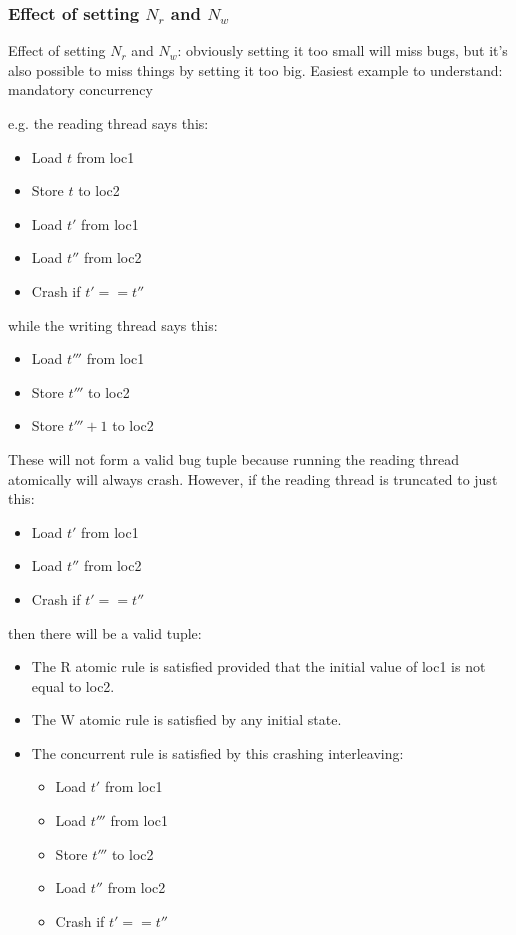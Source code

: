 \documentclass[12pt,a4paper]{book}
\begin{document}
\subsubsection{Effect of setting $N_r$ and $N_w$}
Effect of setting $N_r$ and $N_w$: obviously setting it too small will miss bugs, but it's also possible to miss things by setting it too big.
Easiest example to understand: mandatory concurrency

e.g. the reading thread says this:

\begin{itemize}
\item Load $t$ from loc1
\item Store $t$ to loc2
\item Load $t'$ from loc1
\item Load $t''$ from loc2
\item Crash if $t' == t''$
\end{itemize}

while the writing thread says this:

\begin{itemize}
\item Load $t'''$ from loc1
\item Store $t'''$ to loc2
\item Store $t''' + 1$ to loc2
\end{itemize}

These will not form a valid bug tuple because running the reading thread atomically will always crash.
However, if the reading thread is truncated to just this:

\begin{itemize}
\item Load $t'$ from loc1
\item Load $t''$ from loc2
\item Crash if $t' == t''$
\end{itemize}

then there will be a valid tuple:

\begin{itemize}
\item The R atomic rule is satisfied provided that the initial value of loc1 is not equal to loc2.
\item The W atomic rule is satisfied by any initial state.
\item The concurrent rule is satisfied by this crashing interleaving:
  \begin{itemize}
  \item Load $t'$ from loc1
  \item Load $t'''$ from loc1
  \item Store $t'''$ to loc2
  \item Load $t''$ from loc2
  \item Crash if $t' == t''$
  \end{itemize}
\end{itemize}
\end{document}
